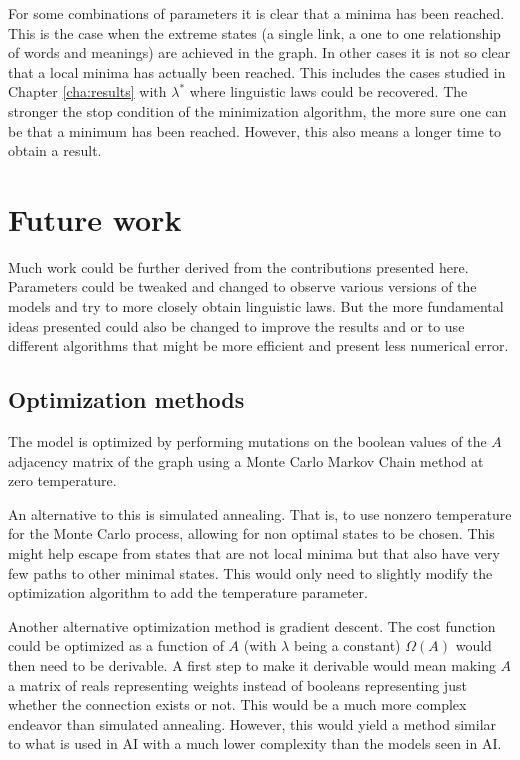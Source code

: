 For some combinations of parameters it is clear that a minima has been reached.
This is the case when the extreme states (a single link, a one to one relationship of words and meanings) are achieved in the graph.
In other cases it is not so clear that a local minima has actually been reached.
This includes the cases studied in Chapter \ref{cha:results} with $\lambda^*$ where linguistic laws could be recovered.
The stronger the stop condition of the minimization algorithm, the more sure one can be that a minimum has been reached.
However, this also means a longer time to obtain a result.

\section{Future work}
\label{sec:discussion_future-work}

Much work could be further derived from the contributions presented here.
Parameters could be tweaked and changed to observe various versions of the models and try to more closely obtain linguistic laws.
But the more fundamental ideas presented could also be changed to improve the results and or to use different algorithms that might be more efficient and present less numerical error.

\subsection{Optimization methods}
\label{sec:discussion_future-work_optimization}

The model is optimized by performing mutations on the boolean values of the $A$ adjacency matrix of the graph using a Monte Carlo Markov Chain method at zero temperature.

An alternative to this is simulated annealing.
That is, to use nonzero temperature for the Monte Carlo process, allowing for non optimal states to be chosen.
This might help escape from states that are not local minima but that also have very few paths to other minimal states.
This would only need to slightly modify the optimization algorithm to add the temperature parameter.

Another alternative optimization method is gradient descent.
The cost function could be optimized as a function of $A$ (with $\lambda$ being a constant) $\Omega(A)$ would then need to be derivable.
A first step to make it derivable would mean making $A$ a matrix of reals representing weights instead of booleans representing just whether the connection exists or not.
This would be a much more complex endeavor than simulated annealing.
However, this would yield a method similar to what is used in AI with a much lower complexity than the models seen in AI.

